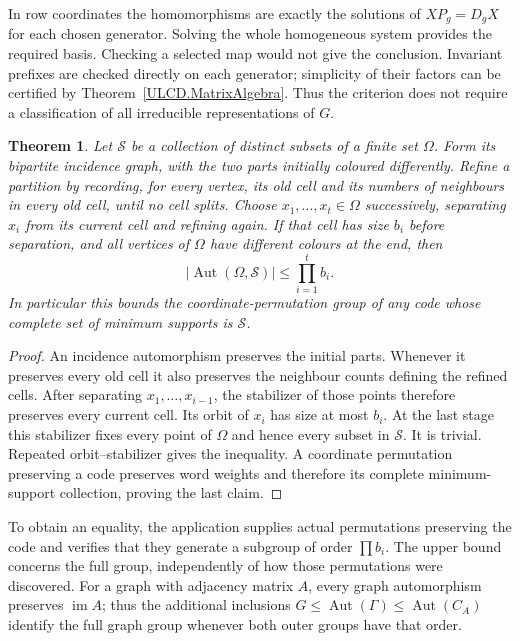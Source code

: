 \documentclass[11pt,a4paper]{article}
\newtheorem{theorem}{Theorem}[section]
\numberwithin{equation}{section}
\newcommand{\im}{\operatorname{im}}
\begin{document}
In row coordinates the homomorphisms are exactly the solutions of
$XP_g=D_gX$ for each chosen generator. Solving the whole homogeneous
system provides the required basis. Checking a selected map would not
give the conclusion. Invariant prefixes are checked directly on each
generator; simplicity of their factors can be certified by
Theorem~\ref{ULCD.MatrixAlgebra}. Thus the criterion does not require a
classification of all irreducible representations of $G$.

\begin{theorem}\label{ULCD.Refinement}
Let $\mathcal S$ be a collection of distinct subsets of a finite set
$\Omega$. Form its bipartite incidence graph, with the two parts initially
coloured differently. Refine a partition by recording, for every vertex,
its old cell and its numbers of neighbours in every old cell, until no
cell splits. Choose $x_1,\ldots,x_t\in\Omega$ successively, separating
$x_i$ from its current cell and refining again. If that cell has size $b_i$
before separation, and all vertices of $\Omega$ have different colours
at the end, then
\[
 |\operatorname{Aut}(\Omega,\mathcal S)|\leq\prod_{i=1}^t b_i.
\]
In particular this bounds the coordinate-permutation group of any code
whose complete set of minimum supports is $\mathcal S$.
\end{theorem}
\begin{proof}
An incidence automorphism preserves the initial parts. Whenever it
preserves every old cell it also preserves the neighbour counts defining
the refined cells. After separating $x_1,\ldots,x_{i-1}$, the stabilizer
of those points therefore preserves every current cell. Its orbit of
$x_i$ has size at most $b_i$. At the last stage this stabilizer fixes
every point of $\Omega$ and hence every subset in $\mathcal S$.
It is trivial. Repeated orbit--stabilizer gives the inequality.
A coordinate permutation preserving a code preserves word weights and
therefore its complete minimum-support collection, proving the last claim.
\end{proof}

To obtain an equality, the application supplies actual permutations
preserving the code and verifies that they generate a subgroup of order
$\prod b_i$. The upper bound concerns the full group, independently of
how those permutations were discovered. For a graph with adjacency matrix
$A$, every graph automorphism preserves $\im A$; thus the additional
inclusions $G\leq\operatorname{Aut}(\Gamma)\leq\operatorname{Aut}(C_A)$
identify the full graph group whenever both outer groups have that order.
\end{document}

